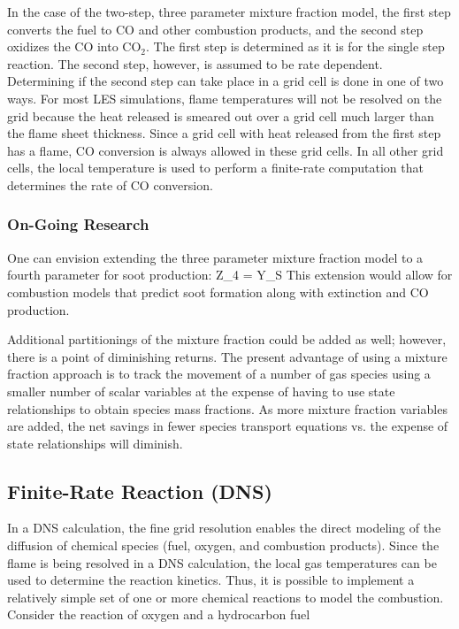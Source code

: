 \documentclass[11pt]{book}
\begin{document}
In the case of the two-step, three parameter mixture fraction model, the first step converts the
fuel to CO and other combustion products, and the second step oxidizes the CO into CO$_2$.  The first step is
determined as it is for the single step reaction.  The second step, however, is assumed to be rate dependent.
Determining if the second step can take place in a grid cell is done in one of two ways.  For most LES
simulations, flame temperatures will not be resolved on the grid because the heat released is smeared out over a grid cell much larger than
the flame sheet thickness.  Since a grid cell with heat released from the first step has a flame, CO conversion is
always allowed in these grid cells.  In all other grid cells, the local temperature is used to perform a finite-rate
computation that determines the rate of CO conversion.



\subsubsection{On-Going Research}

One can envision extending the three parameter mixture fraction model to a fourth parameter for soot production:
\be Z_4 =  Y_S \ee
This extension would allow for combustion models that predict soot formation along with extinction and CO production.

Additional partitionings of the mixture fraction could be added as well; however, there is a point of diminishing
returns.  The present advantage of using a mixture fraction approach is to track the movement of a number of gas
species using a smaller number of scalar variables at the expense of having to use state relationships to obtain
species mass fractions.  As more mixture fraction variables are added, the net savings in fewer species transport
equations vs. the expense of state relationships will diminish.





\subsection{Finite-Rate Reaction (DNS)}

In a DNS calculation, the fine grid resolution enables the direct modeling of the diffusion of chemical species (fuel,
oxygen, and combustion products).  Since the flame is being resolved in a DNS calculation, the local gas
temperatures can be used to determine the reaction kinetics.  Thus, it is possible to implement a relatively simple
set of one or more chemical reactions to model the combustion. Consider the reaction of oxygen and a hydrocarbon
fuel
\end{document}

